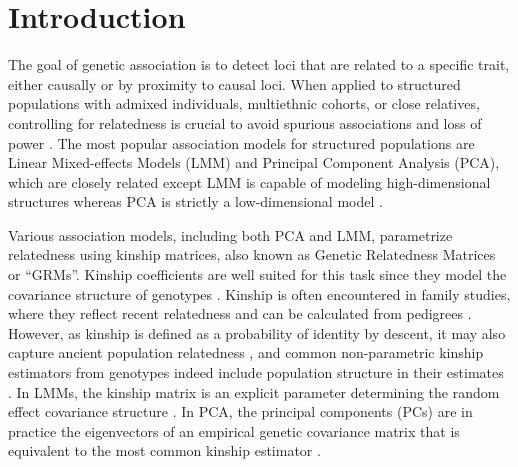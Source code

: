 \documentclass[11pt]{article}
\begin{document}
\section{Introduction}

The goal of genetic association is to detect loci that are related to a specific trait, either causally or by proximity to causal loci.
When applied to structured populations with admixed individuals, multiethnic cohorts, or close relatives, controlling for relatedness is crucial to avoid spurious associations and loss of power \citep{devlin_genomic_1999, voight_confounding_2005, astle_population_2009, yao_limitations_2022}.
The most popular association models for structured populations are Linear Mixed-effects Models (LMM) and Principal Component Analysis (PCA), which are closely related except LMM is capable of modeling high-dimensional structures whereas PCA is strictly a low-dimensional model \citep{astle_population_2009, hoffman_correcting_2013, yao_limitations_2022}.

Various association models, including both PCA and LMM, parametrize relatedness using kinship matrices, also known as Genetic Relatedness Matrices or ``GRMs''.
Kinship coefficients are well suited for this task since they model the covariance structure of genotypes \citep{malecot_mathematiques_1948, jacquard_structures_1970}.
Kinship is often encountered in family studies, where they reflect recent relatedness and can be calculated from pedigrees \citep{wright_coefficients_1922, emik_systematic_1949, garcia-cortes_novel_2015}.
However, as kinship is defined as a probability of identity by descent, it may also capture ancient population relatedness \citep{malecot_mathematiques_1948, astle_population_2009}, and common non-parametric kinship estimators from genotypes indeed include population structure in their estimates \citep{ochoa_estimating_2021}.
In LMMs, the kinship matrix is an explicit parameter determining the random effect covariance structure \citep{xie_combining_1998,yu_unified_2006, aulchenko_genomewide_2007, astle_population_2009, kang_efficient_2008, kang_variance_2010, zhou_genome-wide_2012, yang_advantages_2014, loh_efficient_2015, sul_population_2018}.
In PCA, the principal components (PCs) are in practice the eigenvectors of an empirical genetic covariance matrix that is equivalent to the most common kinship estimator \citep{price_principal_2006, astle_population_2009, hoffman_correcting_2013, yao_limitations_2022}.
\end{document}

